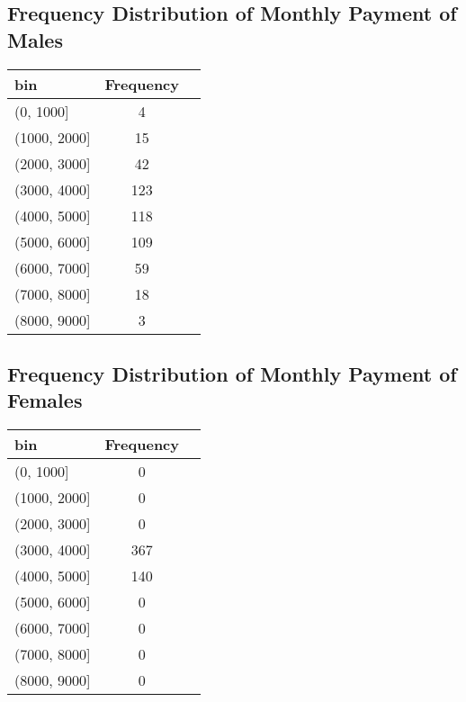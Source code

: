 \documentclass[11pt]{article}
\begin{document}
\subsection{Frequency Distribution of Monthly Payment of Males}
\begin{tabular}{l|cc}
  bin& Frequency& \\
  \hline
  (0, 1000]& 4& \\
  (1000, 2000]& 15&\\
  (2000, 3000]& 42&\\
  (3000, 4000]& 123&\\
  (4000, 5000]& 118&\\
  (5000, 6000]& 109&\\
  (6000, 7000]& 59&\\
  (7000, 8000]& 18&\\
  (8000, 9000]& 3&\\
  
\end{tabular}
\newpage

\subsection{Frequency Distribution of Monthly Payment of Females}
\begin{tabular}{l|cc}
  bin& Frequency& \\
  \hline
  (0, 1000]& 0& \\
  (1000, 2000]& 0&\\
  (2000, 3000]& 0&\\
  (3000, 4000]& 367&\\
  (4000, 5000]& 140&\\
  (5000, 6000]& 0&\\
  (6000, 7000]& 0&\\
  (7000, 8000]& 0&\\
  (8000, 9000]& 0&\\
  
\end{tabular}
\end{document}
